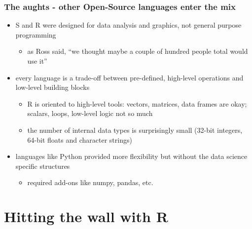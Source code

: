 \documentclass[pdf]{beamer}
\begin{document}
  \begin{frame}\frametitle{The aughts - other Open-Source languages enter the mix}
    \begin{itemize}
      \pause
      \item S and R were designed for data analysis and graphics, not general purpose programming
      \begin{itemize}
        \pause
        \item
        as Ross said, ``we thought maybe a couple of hundred people total  would use it''
      \end{itemize}
      \pause
      \item every language is a trade-off between pre-defined, high-level operations and low-level building blocks
      \begin{itemize}
        \pause
        \item
        R is oriented to high-level tools: vectors, matrices, data frames are okay; scalars, loops, low-level logic not so much
        \item
        the number of internal data types is surprisingly small (32-bit integers, 64-bit floats and character strings)
      \end{itemize}
      \pause
      \item
      languages like Python provided more flexibility but without the data
      science specific structures
      \begin{itemize}
        \pause
        \item required add-ons like numpy, pandas, etc.
      \end{itemize}
    \end{itemize}
  \end{frame}

\section{Hitting the wall with R}
\end{document}
